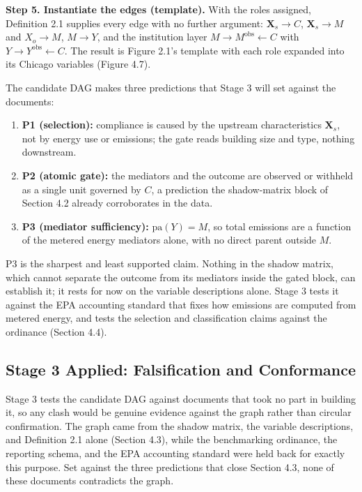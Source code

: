 \textbf{Step 5. Instantiate the edges (template).} With the roles assigned, Definition 2.1 supplies every edge with no further argument: $\mathbf{X}_s \to C$, $\mathbf{X}_s \to M$ and $X_o \to M$, $M \to Y$, and the institution layer $M \to M^{\text{obs}} \leftarrow C$ with $Y \to Y^{\text{obs}} \leftarrow C$. The result is Figure 2.1's template with each role expanded into its Chicago variables (Figure 4.7).

The candidate DAG makes three predictions that Stage 3 will set against the documents:

\begin{enumerate}
  \item \textbf{P1 (selection):} compliance is caused by the upstream characteristics $\mathbf{X}_s$, not by energy use or emissions; the gate reads building size and type, nothing downstream.
  \item \textbf{P2 (atomic gate):} the mediators and the outcome are observed or withheld as a single unit governed by $C$, a prediction the shadow-matrix block of Section 4.2 already corroborates in the data.
  \item \textbf{P3 (mediator sufficiency):} $\mathrm{pa}(Y) = M$, so total emissions are a function of the metered energy mediators alone, with no direct parent outside $M$.
\end{enumerate}

P3 is the sharpest and least supported claim. Nothing in the shadow matrix, which cannot separate the outcome from its mediators inside the gated block, can establish it; it rests for now on the variable descriptions alone. Stage 3 tests it against the EPA accounting standard that fixes how emissions are computed from metered energy, and tests the selection and classification claims against the ordinance (Section 4.4).


\subsection{Stage 3 Applied: Falsification and Conformance}

Stage 3 tests the candidate DAG against documents that took no part in building it, so any clash would be genuine evidence against the graph rather than circular confirmation. The graph came from the shadow matrix, the variable descriptions, and Definition 2.1 alone (Section 4.3), while the benchmarking ordinance, the reporting schema, and the EPA accounting standard were held back for exactly this purpose. Set against the three predictions that close Section 4.3, none of these documents contradicts the graph.

